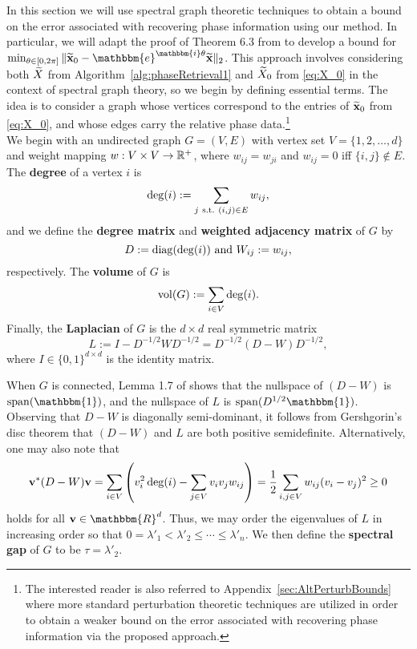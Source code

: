 
 In this section we will use spectral graph theoretic techniques to obtain a bound on the error associated with recovering phase information using our method.  %
In particular, we will adapt the proof of Theorem 6.3 from \cite{alexeev2014phase} to develop a bound for $\min_{\theta\in[0,2\pi]} \Vert \tx_0 - \mathbbm{e}^{\mathbbm{i}\theta}\tx \Vert_2$.  This approach involves considering both $\widetilde{X}$ from Algorithm~\ref{alg:phaseRetrieval1} and $\widetilde{X}_0$ from \eqref{eq:X_0} in the context of spectral graph theory, so we begin by defining essential terms.  The idea is to consider a graph whose vertices correspond to the entries of $\widetilde{\mathbf x}_0$ from \eqref{eq:X_0}, and whose edges carry the relative phase data.\footnote{The interested reader is also referred to Appendix~\ref{sec:AltPerturbBounds} where more standard perturbation theoretic techniques are utilized in order to obtain a  weaker bound on the error associated with recovering phase information via the proposed approach.}
\\

We begin with an undirected graph $G = (V, E)$ with vertex set $V = \{1, 2, \dots, d\}$ and weight mapping $w: V \times V \to \mathbb{R}^+$, where $w_{ij} = w_{ji}$ and $w_{ij} = 0$ iff $\{i, j\} \notin E$.  The \textbf{degree} of a vertex $i$ is \[\deg(i) := \sum_{j ~{\rm s.t.}~ (i, j) \in E} w_{ij},\] and we define the \textbf{degree matrix} and \textbf{weighted adjacency matrix} of $G$ by \[D := \diag(\deg(i)) \ \text{and} \ W_{ij} := w_{ij},\] respectively.  The \textbf{volume} of $G$ is \[\mathrm{vol}(G) := \sum_{i \in V} \deg(i).\]  Finally, the \textbf{Laplacian} of $G$ is the $d \times d$ real symmetric matrix \[L := I - D^{-1/2} W D^{-1/2} = D^{-1/2}(D - W)D^{-1/2},\]
where $I \in \{ 0,1\}^{d \times d}$ is the identity matrix.  

When $G$ is connected, Lemma 1.7 of \cite{chungspectral} shows that the nullspace of $(D - W)$ is $\Span(\mathbbm{1})$, and the nullspace of $L$ is $\Span(D^{1/2}\mathbbm{1})$.  Observing that $D - W$ is diagonally semi-dominant, it follows from Gershgorin's disc theorem that $(D - W)$ and $L$ are both positive semidefinite.  Alternatively, one may also note that 
\[{\bf v}^*(D - W){\bf v} = \sum_{i \in V} \left(v_i^2\deg(i) - \sum_{j \in V} v_i v_j w_{ij}\right) = \frac{1}{2} \sum_{i, j \in V} w_{ij} (v_i - v_j)^2 \geq 0\]
holds for all ${\bf v} \in \mathbbm{R}^d$.  Thus, we may order the eigenvalues of $L$ in increasing order so that $0 = \lambda'_1 < \lambda'_2 \le \cdots \le \lambda'_n$.  
We then define the \textbf{spectral gap} of $G$ to be $\tau = \lambda'_2$.


